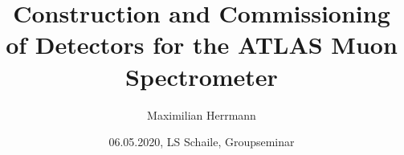 \documentclass[usenames,dvipsnames]{beamer}
\begin{document}
\title[Muon Detectors]{Construction and Commissioning of Detectors for the ATLAS Muon Spectrometer}  
\author[M. Herrmann]{Maximilian Herrmann}
\date[06.05.2020]{06.05.2020, LS Schaile, Groupseminar} 

\frame{\titlepage
	\centering
	\vspace{-3mm}
	
	\hspace{-1.1cm}
	\hspace{2cm}
	\vspace{2mm}
} 

\end{document}
